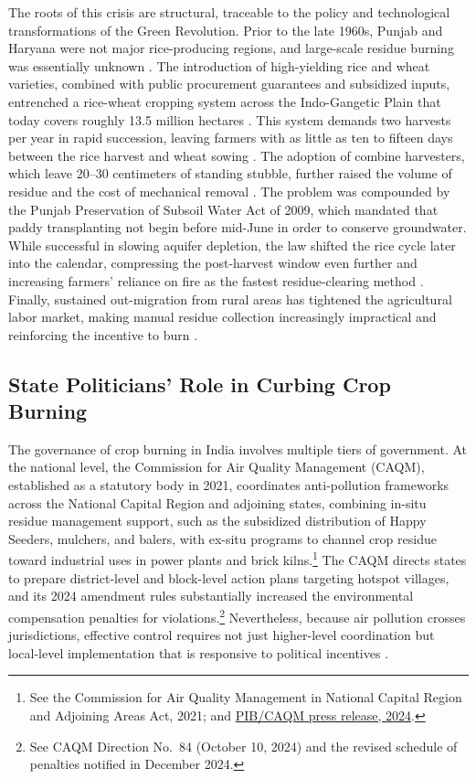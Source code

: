 \documentclass[12pt]{article}
\begin{document}
The roots of this crisis are structural, traceable to the policy and technological transformations of the Green Revolution. Prior to the late 1960s, Punjab and Haryana were not major rice-producing regions, and large-scale residue burning was essentially unknown \citep{singh2018great}. The introduction of high-yielding rice and wheat varieties, combined with public procurement guarantees and subsidized inputs, entrenched a rice-wheat cropping system across the Indo-Gangetic Plain that today covers roughly 13.5 million hectares \citep{kumar2022emerging}. This system demands two harvests per year in rapid succession, leaving farmers with as little as ten to fifteen days between the rice harvest and wheat sowing \citep{kumar2015crop, sahai2011assessment}. The adoption of combine harvesters, which leave 20--30 centimeters of standing stubble, further raised the volume of residue and the cost of mechanical removal \citep{grover2017crop, sidhu2015crop}. The problem was compounded by the Punjab Preservation of Subsoil Water Act of 2009, which mandated that paddy transplanting not begin before mid-June in order to conserve groundwater. While successful in slowing aquifer depletion, the law shifted the rice cycle later into the calendar, compressing the post-harvest window even further and increasing farmers' reliance on fire as the fastest residue-clearing method \citep{maue2021climate, tripathi2016subsoilwater}. Finally, sustained out-migration from rural areas has tightened the agricultural labor market, making manual residue collection increasingly impractical and reinforcing the incentive to burn \citep{garg2023, singh2018great}.
 
 
\subsection{State Politicians' Role in Curbing Crop Burning}\label{ssec:politicians_role}
 
The governance of crop burning in India involves multiple tiers of government. At the national level, the Commission for Air Quality Management (CAQM), established as a statutory body in 2021, coordinates anti-pollution frameworks across the National Capital Region and adjoining states, combining in-situ residue management support, such as the subsidized distribution of Happy Seeders, mulchers, and balers, with ex-situ programs to channel crop residue toward industrial uses in power plants and brick kilns.\footnote{See the Commission for Air Quality Management in National Capital Region and Adjoining Areas Act, 2021; and \href{https://www.pib.gov.in/PressReleaseIframePage.aspx?PRID=2076918}{PIB/CAQM press release, 2024}.} The CAQM directs states to prepare district-level and block-level action plans targeting hotspot villages, and its 2024 amendment rules substantially increased the environmental compensation penalties for violations.\footnote{See CAQM Direction No.\ 84 (October 10, 2024) and the revised schedule of penalties notified in December 2024.} Nevertheless, because air pollution crosses jurisdictions, effective control requires not just higher-level coordination but local-level implementation that is responsive to political incentives \citep{worldbank2014cleaner}.
 
\end{document}
